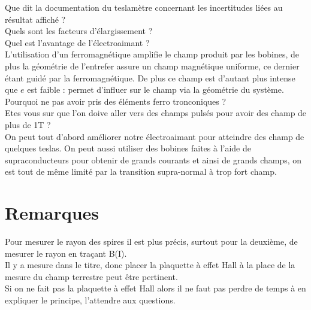 \documentclass[12pt,prb,aps,epsf]{article}
\begin{document}
Que dit la documentation du teslamètre concernant les incertitudes liées au résultat affiché ?\\

Quels sont les facteurs d'élargissement ?\\

Quel est l'avantage de l'électroaimant ?\\
L'utilisation d'un ferromagnétique amplifie le champ produit par les bobines, de plus la géométrie de l'entrefer assure un champ magnétique uniforme, ce dernier étant guidé par la ferromagnétique. De plus ce champ est d'autant plus intense que $e$ est faible : permet d'influer sur le champ via la géométrie du système.\\

Pourquoi ne pas avoir pris des éléments ferro tronconiques ?\\

Etes vous sur que l'on doive aller vers des champs pulsés pour avoir des champ de plus de 1T ?\\
On peut tout d'abord améliorer notre électroaimant pour atteindre des champ de quelques teslas. On peut aussi utiliser des bobines faites à l'aide de supraconducteurs pour obtenir de grands courants et ainsi de grands champs, on est tout de même limité par la transition supra-normal à trop fort champ.

\section*{Remarques}
Pour mesurer le rayon des spires il est plus précis, surtout pour la deuxième, de mesurer le rayon en traçant B(I).\\
Il y a mesure dans le titre, donc placer la plaquette à effet Hall à la place de la mesure du champ terrestre peut être pertinent.\\
Si on ne fait pas la plaquette à effet Hall alors il ne faut pas perdre de temps à en expliquer le principe, l'attendre aux questions.
\end{document}
